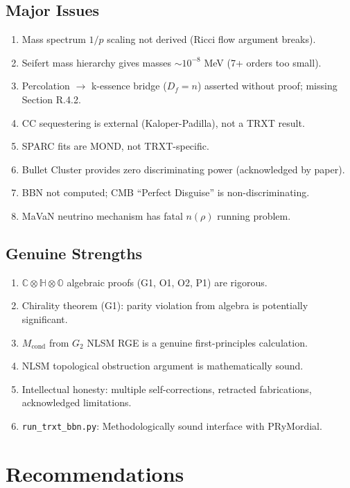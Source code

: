 \documentclass[12pt, a4paper]{article}
\begin{document}
\subsection{Major Issues}
\begin{enumerate}[label=\textbf{M\arabic*}]
    \item Mass spectrum $1/p$ scaling not derived (Ricci flow argument breaks).
    \item Seifert mass hierarchy gives masses $\sim 10^{-8}$ MeV (7+ orders too small).
    \item Percolation $\to$ k-essence bridge ($D_f = n$) asserted without proof; missing Section R.4.2.
    \item CC sequestering is external (Kaloper-Padilla), not a TRXT result.
    \item SPARC fits are MOND, not TRXT-specific.
    \item Bullet Cluster provides zero discriminating power (acknowledged by paper).
    \item BBN not computed; CMB ``Perfect Disguise'' is non-discriminating.
    \item MaVaN neutrino mechanism has fatal $n(\rho)$ running problem.
\end{enumerate}

\subsection{Genuine Strengths}
\begin{enumerate}[label=\textbf{S\arabic*}]
    \item $\mathbb{C} \otimes \mathbb{H} \otimes \mathbb{O}$ algebraic proofs (G1, O1, O2, P1) are rigorous.
    \item Chirality theorem (G1): parity violation from algebra is potentially significant.
    \item $M_{\text{cond}}$ from $G_2$ NLSM RGE is a genuine first-principles calculation.
    \item NLSM topological obstruction argument is mathematically sound.
    \item Intellectual honesty: multiple self-corrections, retracted fabrications, acknowledged limitations.
    \item \texttt{run\_trxt\_bbn.py}: Methodologically sound interface with PRyMordial.
\end{enumerate}

\section{Recommendations}
\end{document}
